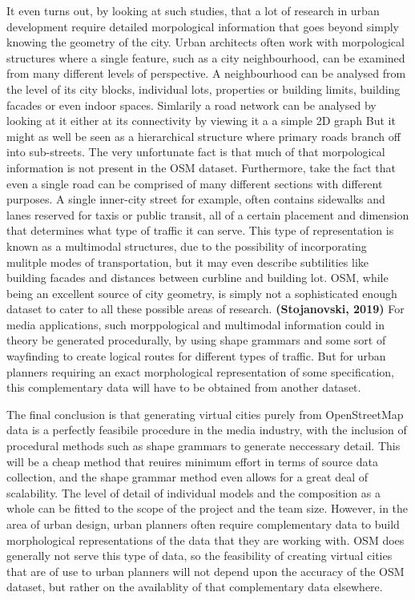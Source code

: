 \documentclass{kththesis}
\begin{document}
It even turns out, by looking at such studies, that a lot of research in urban development require detailed morpological information that goes beyond simply knowing the geometry of the city.
Urban architects often work with morpological structures where a single feature, such as a city neighbourhood, can be examined from many different levels of perspective.
A neighbourhood can be analysed from the level of its city blocks, individual lots, properties or building limits, building facades or even indoor spaces.
Simlarily a road network can be analysed by looking at it either at its connectivity by viewing it a a simple 2D graph
But it might as well be seen as a hierarchical structure where primary roads branch off into sub-streets. 
The very unfortunate fact is that much of that morpological information is not present in the OSM dataset.
Furthermore, take the fact that even a single road can be comprised of many different sections with different purposes.
A single inner-city street for example, often contains sidewalks and lanes reserved for taxis or public transit, all of a certain placement and dimension that determines what type of traffic it can serve.
This type of representation is known as a multimodal structures, due to the possibility of incorporating mulitple modes of transportation, but it may even describe subtilities like building facades and distances between curbline and building lot.
OSM, while being an excellent source of city geometry, is simply not a sophisticated enough dataset to cater to all these possible areas of research.
\textbf{(Stojanovski, 2019)}
For media applications, such morppological and multimodal information could in theory be generated procedurally, by using shape grammars and some sort of wayfinding to create logical routes for different types of traffic.
But for urban planners requiring an exact morphological representation of some specification, this complementary data will have to be obtained from another dataset.

The final conclusion is that generating virtual cities purely from OpenStreetMap data is a perfectly feasibile procedure in the media industry, with the inclusion of procedural methods such as shape grammars to generate neccessary detail.
This will be a cheap method that reuires minimum effort in terms of source data collection, and the shape grammar method even allows for a great deal of scalability.
The level of detail of individual models and the composition as a whole can be fitted to the scope of the project and the team size.
However, in the area of urban design, urban planners often require complementary data to build morphological representations of the data that they are working with.
OSM does generally not serve this type of data, so the feasibility of creating virtual cities that are of use to urban planners will not depend upon the accuracy of the OSM dataset, but rather on the availablity of that complementary data elsewhere.
\end{document}
